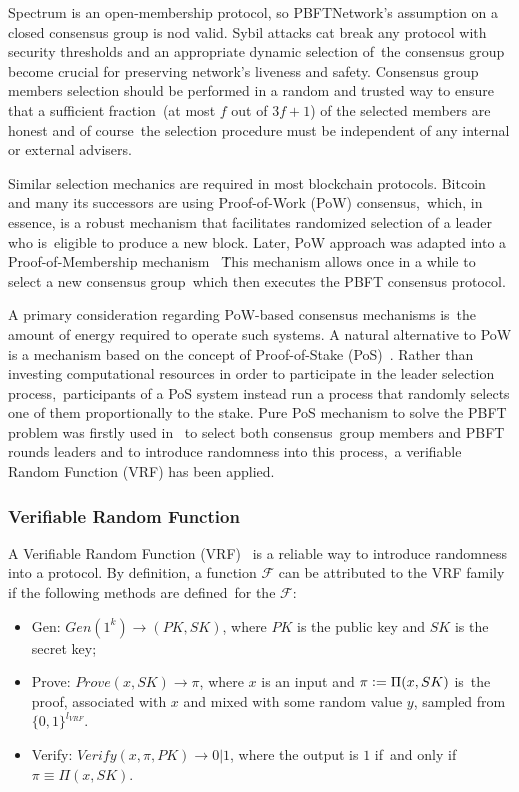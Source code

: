 Spectrum is an open-membership protocol, so PBFTNetwork's assumption on a closed consensus group is nod valid.
Sybil attacks cat break any protocol with security thresholds and an appropriate dynamic selection of\
the consensus group become crucial for preserving network's liveness and safety.
Consensus group members selection should be performed in a random and trusted way to ensure that a sufficient fraction\
(at most $f$ out of ${3 f + 1}$) of the selected members are honest and of course\
the selection procedure must be independent of any internal or external advisers.

Similar selection mechanics are required in most blockchain protocols.
Bitcoin~\cite{nakamoto2009bitcoin} and many its successors are using Proof-of-Work (PoW) consensus,\
which, in essence, is a robust mechanism that facilitates randomized selection of a leader who is\
eligible to produce a new block.
Later, PoW approach was adapted into a Proof-of-Membership mechanism ~\cite{kokoriskogias2016enhancing}\.
This mechanism allows once in a while to select a new consensus group\
which then executes the PBFT consensus protocol.

A primary consideration regarding PoW-based consensus mechanisms is\
the amount of energy required to operate such systems.
A natural alternative to PoW is a mechanism based on the concept of Proof-of-Stake (PoS)~\cite{King2012PPCoinPC}.
Rather than investing computational resources in order to participate in the leader selection process,\
participants of a PoS system instead run a process that randomly selects one of them proportionally to the stake.
Pure PoS mechanism to solve the PBFT problem was firstly used in~\cite{cryptoeprint:2017/454} to select both consensus\
group members and PBFT rounds leaders and to introduce randomness into this process,\
a verifiable Random Function (VRF) has been applied.

\subsubsection{Verifiable Random Function}

A Verifiable Random Function (VRF)~\cite{Micali1999} is a reliable way to introduce randomness into a protocol.
By definition, a function $\mathcal{F}$ can be attributed to the VRF family if the following methods are defined\
for the $\mathcal{F}$:
\begin{itemize}
    \item Gen: ${Gen(1^k) \rightarrow (PK, SK)}$, where $PK$ is the public key and $SK$ is the secret key;
    \item Prove: ${Prove(x, SK) \rightarrow \pi}$, where $x$ is an input and $\pi \vcentcolon= \Pi(x, SK)$ is\
    the proof, associated with $x$ and mixed with some random value $y$, sampled from $\{0,1\}^{l_{VRF}}$.
    \item Verify: ${Verify(x, \pi, PK) \rightarrow 0 | 1}$, where the output is $1$ if\
    and only if ${\pi \equiv \Pi(x, SK)}$.
\end{itemize}

